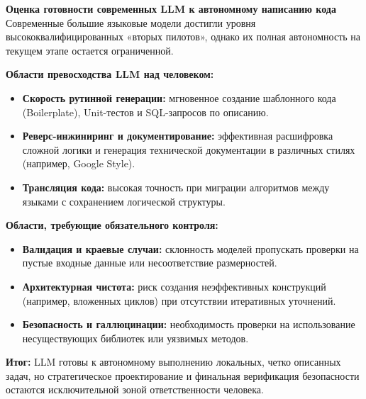 \documentclass[oneside,a4paper,14pt]{extarticle} %
\begin{document}
\textbf{Оценка готовности современных LLM к автономному написанию кода}
\newline
Современные большие языковые модели достигли уровня высококвалифицированных «вторых пилотов», однако их полная автономность на текущем этапе остается ограниченной.

\textbf{Области превосходства LLM над человеком:}
\begin{itemize}
\item \textbf{Скорость рутинной генерации:} мгновенное создание шаблонного кода (Boilerplate), Unit-тестов и SQL-запросов по описанию.
\item \textbf{Реверс-инжиниринг и документирование:} эффективная расшифровка сложной логики и генерация технической документации в различных стилях (например, Google Style).
\item \textbf{Трансляция кода:} высокая точность при миграции алгоритмов между языками с сохранением логической структуры.
\end{itemize}

\textbf{Области, требующие обязательного контроля:}
\begin{itemize}
\item \textbf{Валидация и краевые случаи:} склонность моделей пропускать проверки на пустые входные данные или несоответствие размерностей.
\item \textbf{Архитектурная чистота:} риск создания неэффективных конструкций (например, вложенных циклов) при отсутствии итеративных уточнений.
\item \textbf{Безопасность и галлюцинации:} необходимость проверки на использование несуществующих библиотек или уязвимых методов.
\end{itemize}
\textbf{Итог:} LLM готовы к автономному выполнению локальных, четко описанных задач, но стратегическое проектирование и финальная верификация безопасности остаются исключительной зоной ответственности человека.
\end{document}
